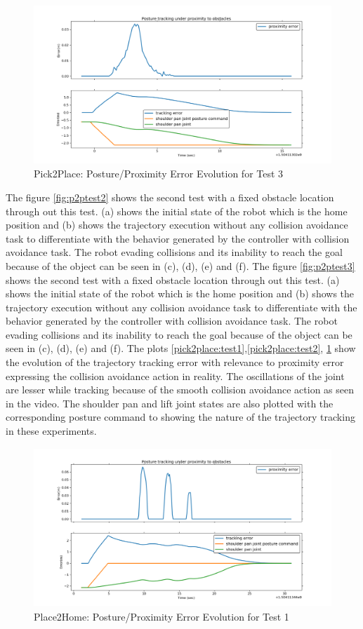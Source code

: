 \begin{figure}[H]
\centering
\includegraphics[width=15cm,height=6cm,center]{chapters/doa/images/delft/test_pick2place/test2.png}
\caption{Pick2Place: Posture/Proximity Error Evolution for Test 3}
\label{pick2place:test3}
\end{figure}
The figure \ref{fig:p2ptest2} shows the second test with a fixed obstacle location through out this test. (a) shows the initial state of the robot which is the home position and (b) shows the trajectory execution without any collision avoidance task to differentiate with the behavior generated by the controller with collision avoidance task. The robot evading collisions and its inability to reach the goal because of the object can be seen in (c), (d), (e) and (f). The figure \ref{fig:p2ptest3} shows the second test with a fixed obstacle location through out this test. (a) shows the initial state of the robot which is the home position and (b) shows the trajectory execution without any collision avoidance task to differentiate with the behavior generated by the controller with collision avoidance task. The robot evading collisions and its inability to reach the goal because of the object can be seen in (c), (d), (e) and (f). The plots \ref{pick2place:test1},\ref{pick2place:test2}, \ref{pick2place:test3} show the evolution of the trajectory tracking error with relevance to proximity error expressing the collision avoidance action in reality. The oscillations of the joint are lesser while tracking because of the smooth collision avoidance action as seen in the video. The shoulder pan and lift joint states are also plotted with the corresponding posture command to showing the nature of the trajectory tracking in these experiments.  
\begin{figure}[H]
\centering
\includegraphics[width=15cm,height=6cm,center]{chapters/doa/images/delft/test_place2home/test1.png}
\caption{Place2Home: Posture/Proximity Error Evolution for Test 1}
\label{Place2Home:test1}
\end{figure}

